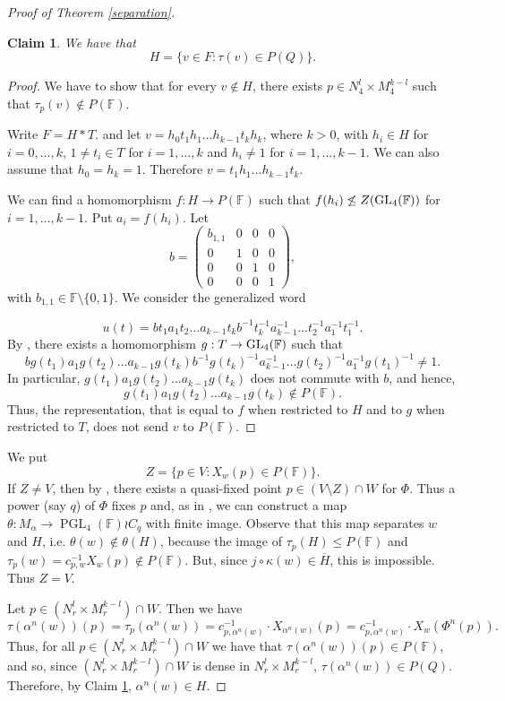 \documentclass{amsart}
\newtheorem{claim}[lem]{Claim}
\theoremstyle{definition}
\theoremstyle{remark}
\DeclareMathOperator{\PGL}{PGL}
\newcommand{\F}{\mathbb{F}}
\begin{document}
\begin{proof}[Proof of Theorem \ref{separation}]
\begin{claim} \label{duda}
We have that  $$H= \{v\in F: \tau(v)\in   P(Q)\}.$$
\end{claim}

\begin{proof}
 We have to show that for every $v\not \in H$, there exists $p\in N_4^l\times M_4^{k-l}$ such that $\tau_p(v)\not \in P(\F) $. 
 
 Write $F=H*T$.
 and let $v=h_0t_1h_1\ldots h_{k-1}t_k h_k$, where $k>0$, with $h_i\in H$ for $i=0,\ldots, k$, $1\ne t_i\in T$ for $i=1,\ldots , k$ and $h_i\ne 1 $ for $i=1,\ldots , k-1$. We can also assume that $h_0=h_k=1$. Therefore
 $v= t_1h_1\ldots h_{k-1}t_k$. 
 
 We can find a homomorphism $f:H\to P(\F)$ such that $f(h_i)\not  \le Z(\GL_4(\F))$ for $i=1,\ldots, k-1$. Put $a_i=f(h_i)$. Let
 $$b=\left ( \begin{array}{cccc}
b_{1,1} & 0 & 0 & 0\\
0 &1 & 0 & 0 \\
0 & 0 & 1 & 0\\
0 & 0 &0 & 1\end{array}
\right ),$$
with $b_{1,1}\in \F\setminus \{0,1\}$. We consider the generalized word

$$u(t)=   bt_1a_1t_2 \ldots a_{k-1} t_kb^{-1}t_k^{-1}a_{k-1}^{-1}\ldots t_2^{-1}a_1^{-1}t^{-1}_1.$$
 By \cite[Theorem 5]{To84}, there exists a homomorphism $g:T\to   \GL_4(\F)$ such that 
 $$ bg(t_1)a_1g(t_2) \ldots a_{k-1} g(t_k)b^{-1}g(t_k)^{-1}a_{k-1}^{-1}\ldots g(t_2)^{-1}a_1^{-1}g(t_1)^{-1} \ne 1.$$ In particular, $g(t_1)a_1g(t_2) \ldots a_{k-1}g(t_k)$ does not commute with $b$, and hence,
 $$g(t_1)a_1g(t_2) \ldots a_{k-1}g(t_k) \not \in P(\F).$$
 Thus, the representation, that is equal to $f$ when restricted to $H$ and to $g$ when restricted to $T$,   does not send $v$ to $P(\F)$.
\end{proof}
We put $$Z=\{p\in V:   X_w(p)\in P(\F)  \}.$$
If $Z\ne V$, then by  \cite[Theorem 1.4]{BS05}, there exists a quasi-fixed point $p\in (V\setminus Z)\cap W$ for $\Phi$. Thus a  power (say $q$) of $\Phi$ fixes $p$ and,    as in \cite[Lemma 2.2]{BS05}, we can construct a map $\theta: M_\alpha \to \PGL_4(\F)\wr C_q$ with finite image.  Observe that this map separates $w$ and $H$, i.e. $\theta(w)\not \in \theta(H)$, because the image of $\tau_p(H)\le P(\F)$  and $\tau_p(w)=c_{p,w}^{-1}X_w(p)\not \in  P(\F)$. But, since $j\circ \kappa(w)\in \overline H$, this is impossible. Thus $Z=V$. 

Let $p\in (N_r^l\times M_r^{k-l})\cap W$. Then  we have
$$\tau(\alpha^n(w))(p)= \tau_p(\alpha^n(w))=c_{p,\alpha^n(w)} ^{-1}\cdot  X_{\alpha^n(w)}(p)= c_{p,\alpha^n(w)} ^{-1}\cdot   X_w(\Phi^n(p)).$$ Thus, 
for all $p\in  (N_r^l\times M_r^{k-l})\cap W$ we have that
$ \tau(\alpha^n(w))(p)\in P(\F)$, 
and so, since $(N_r^l\times M_r^{k-l})\cap W$ is dense in $N_r^l\times M_r^{k-l}$,
$  \tau(\alpha^n(w))\in P(Q)$.
Therefore, by Claim \ref{duda}, $ \alpha^n(w) \in  H$.  \end{proof}
  
\end{document}
